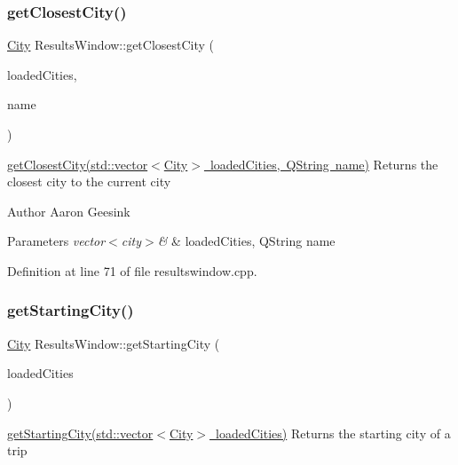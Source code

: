 \subsubsection{\texorpdfstring{getClosestCity()}{getClosestCity()}}
{\footnotesize\ttfamily \mbox{\hyperlink{class_city}{City}} Results\+Window\+::get\+Closest\+City (\begin{DoxyParamCaption}\item[{std\+::vector$<$ \mbox{\hyperlink{class_city}{City}} $>$}]{loaded\+Cities,  }\item[{Q\+String}]{name }\end{DoxyParamCaption})}



\mbox{\hyperlink{class_results_window_ad58645a2626daa51d8e824d56df7145f}{get\+Closest\+City(std\+::vector$<$\+City$>$ loaded\+Cities, Q\+String name)}} Returns the closest city to the current city 

\begin{DoxyAuthor}{Author}
Aaron Geesink 
\end{DoxyAuthor}

\begin{DoxyParams}{Parameters}
{\em vector$<$city$>$\&} & loaded\+Cities, Q\+String name \\
\hline
\end{DoxyParams}


Definition at line 71 of file resultswindow.\+cpp.

\mbox{\label{class_results_window_ae9d02be8b007fcbc61f6d6536ba1520f}} 
\subsubsection{\texorpdfstring{getStartingCity()}{getStartingCity()}}
{\footnotesize\ttfamily \mbox{\hyperlink{class_city}{City}} Results\+Window\+::get\+Starting\+City (\begin{DoxyParamCaption}\item[{std\+::vector$<$ \mbox{\hyperlink{class_city}{City}} $>$}]{loaded\+Cities }\end{DoxyParamCaption})}



\mbox{\hyperlink{class_results_window_ae9d02be8b007fcbc61f6d6536ba1520f}{get\+Starting\+City(std\+::vector$<$\+City$>$ loaded\+Cities)}} Returns the starting city of a trip 

